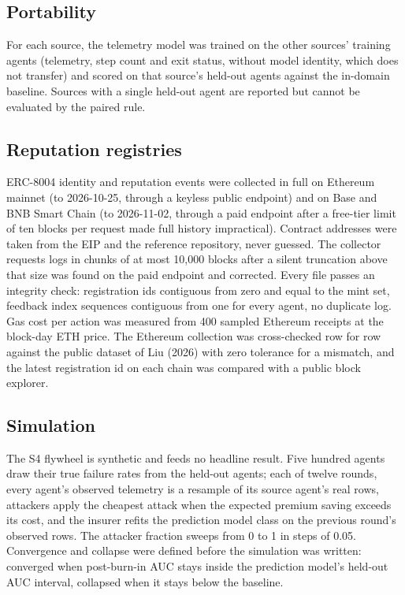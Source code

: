 \documentclass[
  11pt,
  a4paper,
]{article}
\begin{document}
\hypertarget{portability}{%
\subsection{Portability}\label{portability}}

For each source, the telemetry model was trained on the other sources'
training agents (telemetry, step count and exit status, without model
identity, which does not transfer) and scored on that source's held-out
agents against the in-domain baseline. Sources with a single held-out
agent are reported but cannot be evaluated by the paired rule.

\hypertarget{reputation-registries}{%
\subsection{Reputation registries}\label{reputation-registries}}

ERC-8004 identity and reputation events were collected in full on
Ethereum mainnet (to 2026-10-25, through a keyless public endpoint) and
on Base and BNB Smart Chain (to 2026-11-02, through a paid endpoint
after a free-tier limit of ten blocks per request made full history
impractical). Contract addresses were taken from the EIP and the
reference repository, never guessed. The collector requests logs in
chunks of at most 10,000 blocks after a silent truncation above that
size was found on the paid endpoint and corrected. Every file passes an
integrity check: registration ids contiguous from zero and equal to the
mint set, feedback index sequences contiguous from one for every agent,
no duplicate log. Gas cost per action was measured from 400 sampled
Ethereum receipts at the block-day ETH price. The Ethereum collection
was cross-checked row for row against the public dataset of Liu (2026)
with zero tolerance for a mismatch, and the latest registration id on
each chain was compared with a public block explorer.

\hypertarget{simulation}{%
\subsection{Simulation}\label{simulation}}

The S4 flywheel is synthetic and feeds no headline result. Five hundred
agents draw their true failure rates from the held-out agents; each of
twelve rounds, every agent's observed telemetry is a resample of its
source agent's real rows, attackers apply the cheapest attack when the
expected premium saving exceeds its cost, and the insurer refits the
prediction model class on the previous round's observed rows. The
attacker fraction sweeps from 0 to 1 in steps of 0.05. Convergence and
collapse were defined before the simulation was written: converged when
post-burn-in AUC stays inside the prediction model's held-out AUC
interval, collapsed when it stays below the baseline.
\end{document}
